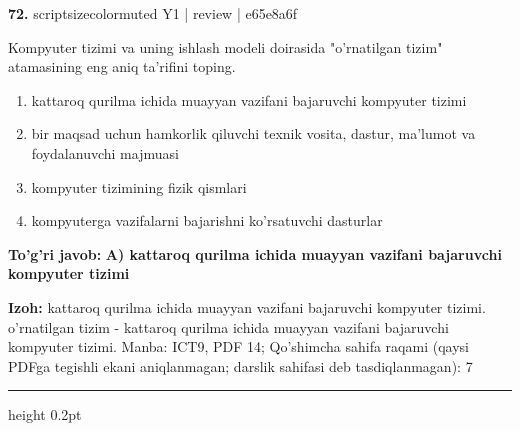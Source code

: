 \documentclass[10pt,a4paper]{article}
\begin{document}
{\bfseries\sffamily\color{ink} 72.} {scriptsizecolor{muted} Y1 | review | e65e8a6f}
\par
Kompyuter tizimi va uning ishlash modeli doirasida "o'rnatilgan tizim" atamasining eng aniq ta'rifini toping.
\begin{enumerate}[label=\Alph*),leftmargin=9mm]
\item kattaroq qurilma ichida muayyan vazifani bajaruvchi kompyuter tizimi
\item bir maqsad uchun hamkorlik qiluvchi texnik vosita, dastur, ma'lumot va foydalanuvchi majmuasi
\item kompyuter tizimining fizik qismlari
\item kompyuterga vazifalarni bajarishni ko'rsatuvchi dasturlar
\end{enumerate}
\begin{tcolorbox}[enhanced,breakable,colback=teal!4,colframe=teal!60!black,boxrule=0.45pt,arc=1.2mm,left=2.7mm,right=2.7mm,top=1.8mm,bottom=1.8mm,before skip=2mm,after skip=2mm]
{\bfseries\sffamily\color{teal}To'g'ri javob:} \textbf{A) kattaroq qurilma ichida muayyan vazifani bajaruvchi kompyuter tizimi}
\par\smallskip
{\bfseries Izoh:} kattaroq qurilma ichida muayyan vazifani bajaruvchi kompyuter tizimi. o'rnatilgan tizim - kattaroq qurilma ichida muayyan vazifani bajaruvchi kompyuter tizimi. Manba: ICT9, PDF 14; Qo'shimcha sahifa raqami (qaysi PDFga tegishli ekani aniqlanmagan; darslik sahifasi deb tasdiqlanmagan): 7
\end{tcolorbox}
\vspace{2mm}\hrule height 0.2pt\vspace{3mm}
\end{document}
